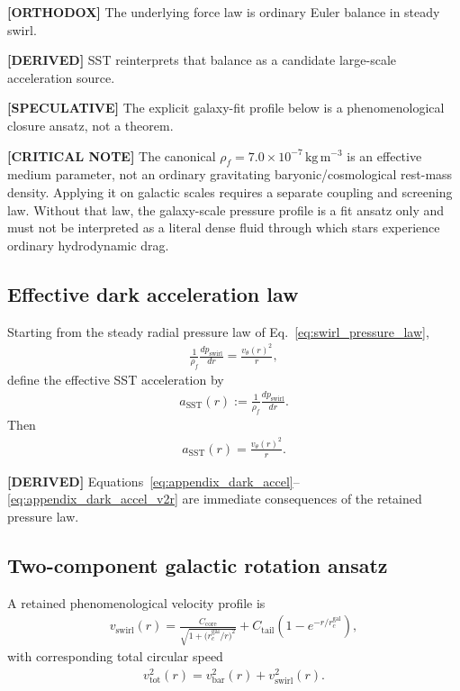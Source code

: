 \documentclass[11pt]{article}
\theoremstyle{definition}
\theoremstyle{plain}
\theoremstyle{remark}
\newcommand{\rhoF}{{\rho_{\!f}}}
\begin{document}
        \textbf{[ORTHODOX]} The underlying force law is ordinary Euler balance in steady swirl.
        
        \textbf{[DERIVED]} SST reinterprets that balance as a candidate large-scale acceleration source.
        
        \textbf{[SPECULATIVE]} The explicit galaxy-fit profile below is a phenomenological closure ansatz, not a theorem.

        \textbf{[CRITICAL NOTE]} The canonical \(\rhoF=7.0\times10^{-7}\,\mathrm{kg\,m^{-3}}\) is an effective medium parameter, not an ordinary gravitating baryonic/cosmological rest-mass density. Applying it on galactic scales requires a separate coupling and screening law. Without that law, the galaxy-scale pressure profile is a fit ansatz only and must not be interpreted as a literal dense fluid through which stars experience ordinary hydrodynamic drag.
    
    \subsection{Effective dark acceleration law}
        Starting from the steady radial pressure law of Eq.~\eqref{eq:swirl_pressure_law},
        \begin{align}
            \frac{1}{\rhoF}\frac{dp_{\mathrm{swirl}}}{dr}
            =
            \frac{v_\theta(r)^2}{r},
        \end{align}
        define the effective SST acceleration by
        \begin{align}
            a_{\mathrm{SST}}(r)
            :=
            \frac{1}{\rhoF}\frac{dp_{\mathrm{swirl}}}{dr}.
            \label{eq:appendix_dark_accel}
        \end{align}
        Then
        \begin{align}
            a_{\mathrm{SST}}(r)=\frac{v_\theta(r)^2}{r}.
            \label{eq:appendix_dark_accel_v2r}
        \end{align}
        
        \textbf{[DERIVED]} Equations~\eqref{eq:appendix_dark_accel}--\eqref{eq:appendix_dark_accel_v2r} are immediate consequences of the retained pressure law.
    
    \subsection{Two-component galactic rotation ansatz}
        A retained phenomenological velocity profile is
        \begin{align}
            v_{\mathrm{swirl}}(r)
            =
            \frac{C_{\mathrm{core}}}{\sqrt{1+\bigl(r_c^{\mathrm{gal}}/r\bigr)^2}}
            +
            C_{\mathrm{tail}}
            \left(1-e^{-r/r_c^{\mathrm{gal}}}\right),
            \label{eq:galactic_velocity_ansatz}
        \end{align}
        with corresponding total circular speed
        \begin{align}
            v_{\mathrm{tot}}^2(r)
            =
            v_{\mathrm{bar}}^2(r)
            +
            v_{\mathrm{swirl}}^2(r).
            \label{eq:total_circular_speed_appendix}
        \end{align}
        
\end{document}
